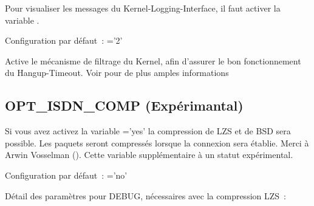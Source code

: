\begin{description}
  Pour visualiser les messages du Kernel-Logging-Interface, il faut
  activer la variable .


  Configuration par défaut~: ='2'

\begin{sloppypar}

Active le mécanisme de filtrage du Kernel, afin d'assurer le bon fonctionnement
du Hangup-Timeout. Voir pour de plus amples informations
\end{sloppypar}
\end{description}

\subsection{OPT\_ISDN\_COMP (Expérimantal)}

Si vous avez activez la variable ='yes'
la compression de LZS et de BSD sera possible. Les paquets seront compressés
lorsque la connexion sera établie. Merci à Arwin Vosselman 
(). Cette variable supplémentaire à un statut expérimental.

Configuration par défaut~: ='no'

Détail des paramètres pour DEBUG, nécessaires avec la compression LZS~:

